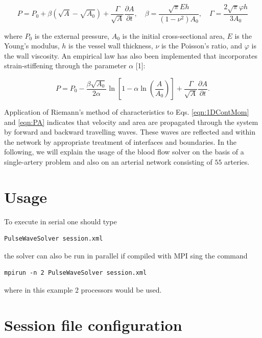 \begin{equation}
P=P_{0}+\beta\left(\sqrt{A}-\sqrt{A_{0}}\right) + \frac{\Gamma}{\sqrt{A}}\frac{\partial A}{\partial t}, \quad \beta=\frac{\sqrt{\pi}E h }{(1-\nu^{2})A_{0}}, \quad \Gamma = \frac{2\sqrt{\pi} \varphi h}{3A_{0}}
\label{eqn:PA}
\end{equation}

where $P_{0}$ is the external pressure, $A_{0}$ is the initial cross-sectional area, $E$ is the Young's modulus, $h$ is the vessel wall thickness, $\nu$ is the Poisson's ratio, and $\varphi$ is the wall viscosity. An empirical law has also been implemented that incorporates strain-stiffening through the parameter $\alpha$ [1]:

\begin{equation}
	\label{eqn:EmpiricalLaw}
    P = P_{0} - \frac{\beta \sqrt{A_{0}}}{2\alpha}\ln{\left[1 - \alpha\ln{\left(\frac{A}{A_{0}}\right)}\right]} + \frac{\Gamma}{\sqrt{A}}\frac{\partial A}{\partial t}.
\end{equation}

Application of Riemann's method of characteristics to
Eqs. \eqref{eqn:1DContMom} and \eqref{eqn:PA} indicates that velocity
and area are propagated through the system by forward and backward
travelling waves. These waves are reflected and within the network by
appropriate treatment of interfaces and boundaries. In the following,
we will explain the usage of the blood flow solver on the basis of a
single-artery problem and also on an arterial network consisting of
$55$ arteries.

\section{Usage}
To execute in serial one should type
\begin{lstlisting}[style=BashInputStyle]
PulseWaveSolver session.xml
\end{lstlisting}

the solver can also be run in parallel if compiled with MPI sing the command

\begin{lstlisting}[style=BashInputStyle]
mpirun -n 2 PulseWaveSolver session.xml
\end{lstlisting}

where in this example 2 processors would be used. 

\section{Session file configuration}

